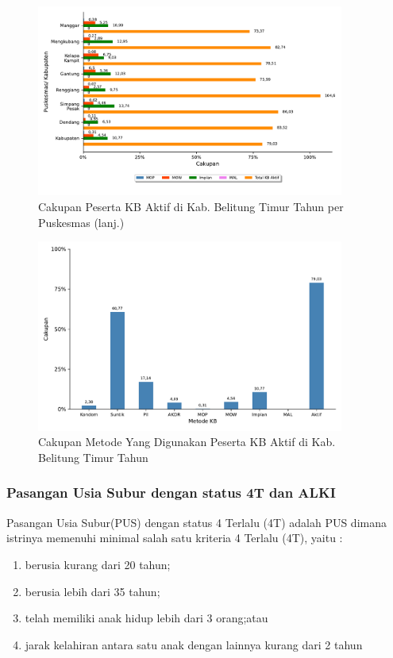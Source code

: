 \begin{figure}[H]
    \centering
    \includegraphics[width=0.9\textwidth]{bab_05/bab_05_06_KBaktif_b}
    \caption{Cakupan Peserta KB Aktif di Kab. Belitung Timur Tahun \tP per Puskesmas (lanj.)}
    \label{fig:Cakupan-KB-aktif-b}
\end{figure}

\begin{figure}[H]
    \centering
    \includegraphics[width=0.9\textwidth]{bab_05/bab_05_06_KBaktif_c}
    \caption{Cakupan Metode Yang Digunakan Peserta KB Aktif di Kab. Belitung Timur Tahun \tP}
    \label{fig:Cakupan-KB-aktif-c}
\end{figure}

\subsubsection{Pasangan Usia Subur dengan status 4T dan ALKI}
Pasangan Usia Subur(PUS) dengan status 4 Terlalu (4T) adalah PUS dimana istrinya memenuhi minimal salah satu kriteria 4 Terlalu (4T), yaitu :
\begin{enumerate}
	\item berusia kurang dari 20 tahun;
	\item berusia lebih dari 35 tahun;
	\item telah memiliki anak hidup lebih dari 3 orang;atau
	\item jarak kelahiran antara satu anak dengan lainnya kurang dari 2 tahun
\end{enumerate}

